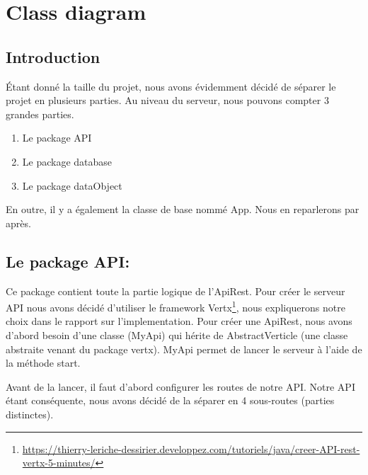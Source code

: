 \section{Class diagram}

\subsection{Introduction}
\begin{flushleft}
Étant donné la taille du projet, nous avons évidemment décidé de séparer le projet en plusieurs parties. Au niveau du serveur, nous pouvons compter 3 grandes parties.
\end{flushleft}

\begin{enumerate}[-]
\item Le package API
\item Le package database
\item Le package dataObject
\end{enumerate}

\begin{flushleft}
En outre, il y a également la classe de base nommé App. Nous en reparlerons par après.
\end{flushleft}
\newpage
\subsection{Le package API:}

\begin{flushleft}
Ce package contient toute la partie logique de l'ApiRest. Pour créer le serveur API nous avons décidé d'utiliser le framework Vertx\footnote{\url{https://thierry-leriche-dessirier.developpez.com/tutoriels/java/creer-API-rest-vertx-5-minutes/}}, nous expliquerons notre choix dans le rapport sur l'implementation. Pour créer une ApiRest, nous avons d'abord besoin d'une classe (MyApi) qui hérite de AbstractVerticle (une classe abstraite venant du package vertx). MyApi permet de lancer le serveur à l'aide de la méthode start.
\end{flushleft}

\begin{flushleft}
Avant de la lancer, il faut d'abord configurer les routes de notre API. Notre API étant conséquente, nous avons décidé de la séparer en 4 sous-routes (parties distinctes).
\end{flushleft}

